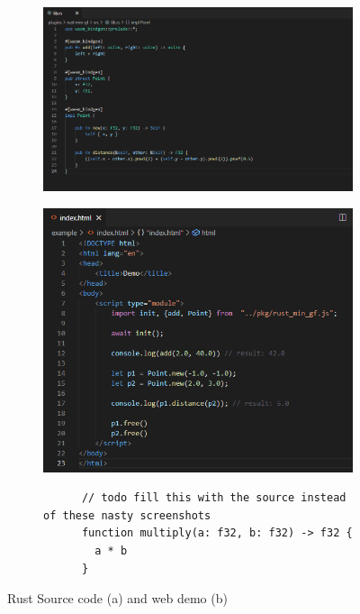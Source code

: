 \begin{figure}
  \centering
  \begin{subfigure}[b]{0.45\linewidth}
    \graphicspath{{../../assets/images/6.1.1/}}
    \centering
    \includegraphics[width=\linewidth]{8.PNG}
    \caption{}\label{fig:min-rust-plugin-code:1}
  \end{subfigure}%
  \qquad %
  \begin{subfigure}[b]{0.45\linewidth}
    \graphicspath{{../../assets/images/6.1.1/}}
    \centering
    \includegraphics[width=\linewidth]{9.PNG}
    \caption{}\label{fig:min-rust-plugin-code:2}
  \end{subfigure}%

  \begin{subfigure}[b]{0.45\linewidth}
    \begin{lstlisting}
      // todo fill this with the source instead of these nasty screenshots
      function multiply(a: f32, b: f32) -> f32 {
        a * b
      }
    \end{lstlisting}  
  \end{subfigure}%

    

  \caption[minimal rust geofront plugin: usage]{Rust Source code (a) and web demo (b)}
  \label{fig:min-rust-plugin-code}
\end{figure}

